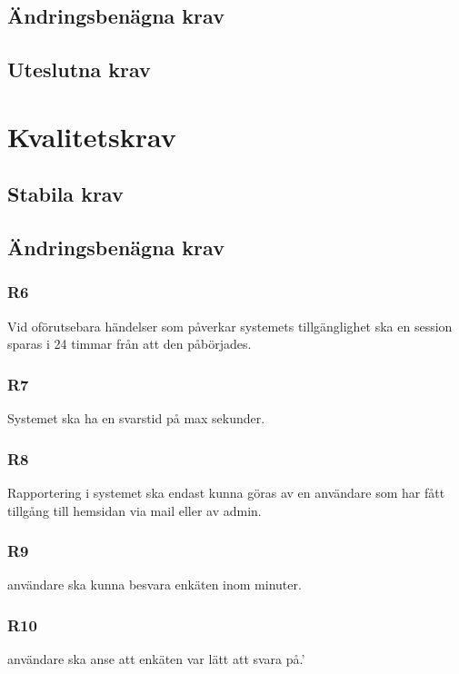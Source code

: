 \documentclass{article}
\begin{document}
    \newpage
    \subsection*{Ändringsbenägna krav}
    \subsection*{Uteslutna krav}
    
  
   
    \section{Kvalitetskrav}
    \subsection*{Stabila krav}
    
  
     \subsection*{Ändringsbenägna krav}
     \subsubsection*{R6}
     Vid oförutsebara händelser som påverkar systemets tillgänglighet ska en session sparas i 24 timmar från att den påbörjades.
     
     \subsubsection*{R7}
    Systemet ska ha en svarstid på max \underline{\hspace{1cm}} sekunder.
    
    \subsubsection*{R8}
    Rapportering i systemet ska endast kunna göras av en användare som har fått tillgång till hemsidan via mail eller av admin.
    
     \subsubsection*{R9}
   \underline{\hspace{1cm}} användare ska kunna besvara enkäten inom \underline{\hspace{1cm}} minuter.
    
    \subsubsection*{R10}
    \underline{\hspace{1cm}} användare ska anse att enkäten var lätt att svara på.'
    
\end{document}
